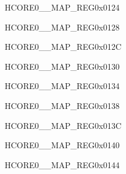 \begin{register}{H}{CORE0\_\_MAP\_REG}{0x0124}\label{regdesc:CORE0KMINTMAPREG}
\end{register}\vspace{-3em}


\begin{register}{H}{CORE0\_\_MAP\_REG}{0x0128}\label{regdesc:CORE0GPIOINT0MAPREG}
\end{register}\vspace{-3em}


\begin{register}{H}{CORE0\_\_MAP\_REG}{0x012C}\label{regdesc:CORE0GPIOINT1MAPREG}
\end{register}\vspace{-3em}


\begin{register}{H}{CORE0\_\_MAP\_REG}{0x0130}\label{regdesc:CORE0GPIOINT2MAPREG}
\end{register}\vspace{-3em}


\begin{register}{H}{CORE0\_\_MAP\_REG}{0x0134}\label{regdesc:CORE0GPIOINT3MAPREG}
\end{register}\vspace{-3em}


\begin{register}{H}{CORE0\_\_MAP\_REG}{0x0138}\label{regdesc:CORE0GPIOPADCOMPINTMAPREG}
\end{register}\vspace{-3em}


\begin{register}{H}{CORE0\_\_MAP\_REG}{0x013C}\label{regdesc:CORE0CPUINTFROMCPU0MAPREG}
\end{register}\vspace{-3em}


\begin{register}{H}{CORE0\_\_MAP\_REG}{0x0140}\label{regdesc:CORE0CPUINTFROMCPU1MAPREG}
\end{register}\vspace{-3em}


\begin{register}{H}{CORE0\_\_MAP\_REG}{0x0144}\label{regdesc:CORE0CPUINTFROMCPU2MAPREG}
\end{register}\vspace{-3em}


